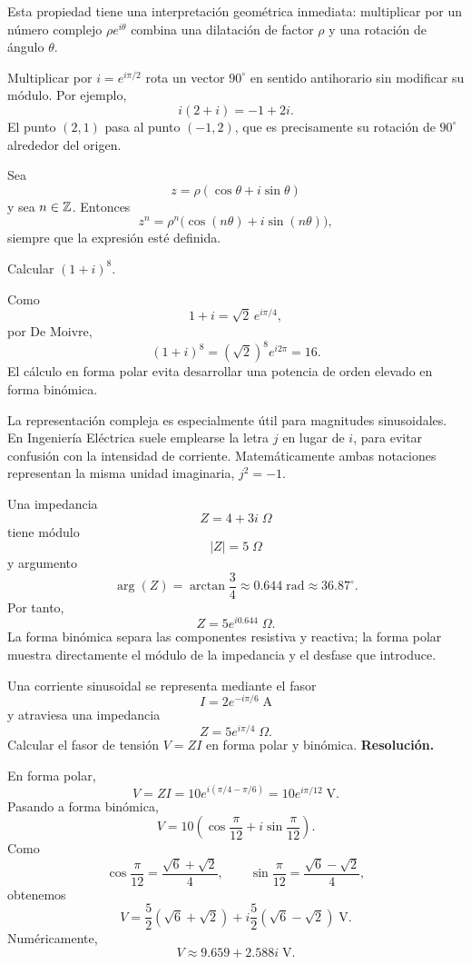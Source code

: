 Esta propiedad tiene una interpretación geométrica inmediata: multiplicar por un número complejo \(\rho e^{i\theta}\) combina una dilatación de factor \(\rho\) y una rotación de ángulo \(\theta\).

\begin{example}
Multiplicar por \(i=e^{i\pi/2}\) rota un vector \(90^\circ\) en sentido antihorario sin modificar su módulo. Por ejemplo,
\[
i(2+i)=-1+2i.
\]
El punto \((2,1)\) pasa al punto \((-1,2)\), que es precisamente su rotación de \(90^\circ\) alrededor del origen.
\end{example}

\begin{proposition}
Sea
\[
z=\rho(\cos\theta+i\sin\theta)
\]
y sea \(n\in\mathbb{Z}\). Entonces
\[
z^n=\rho^n\bigl(\cos(n\theta)+i\sin(n\theta)\bigr),
\]
siempre que la expresión esté definida.
\end{proposition}

\begin{example}
Calcular \((1+i)^8\).

Como
\[
1+i=\sqrt2\,e^{i\pi/4},
\]
por De Moivre,
\[
(1+i)^8=(\sqrt2)^8e^{i2\pi}=16.
\]
El cálculo en forma polar evita desarrollar una potencia de orden elevado en forma binómica.
\end{example}

La representación compleja es especialmente útil para magnitudes sinusoidales. En Ingeniería Eléctrica suele emplearse la letra \(j\) en lugar de \(i\), para evitar confusión con la intensidad de corriente. Matemáticamente ambas notaciones representan la misma unidad imaginaria, \(j^2=-1\).

\begin{example}
Una impedancia
\[
Z=4+3i\;\Omega
\]
tiene módulo
\[
|Z|=5\;\Omega
\]
y argumento
\[
\arg(Z)=\arctan\frac34\approx0.644\;\mathrm{rad}\approx36.87^\circ.
\]
Por tanto,
\[
Z=5e^{i0.644}\;\Omega.
\]
La forma binómica separa las componentes resistiva y reactiva; la forma polar muestra directamente el módulo de la impedancia y el desfase que introduce.
\end{example}

\begin{solvedexercise}
Una corriente sinusoidal se representa mediante el fasor
\[
I=2e^{-i\pi/6}\;\mathrm{A}
\]
y atraviesa una impedancia
\[
Z=5e^{i\pi/4}\;\Omega.
\]
Calcular el fasor de tensión \(V=ZI\) en forma polar y binómica.
\tcblower
\textbf{Resolución.}\par\smallskip
En forma polar,
\[
V=ZI=10e^{i(\pi/4-\pi/6)}=10e^{i\pi/12}\;\mathrm{V}.
\]
Pasando a forma binómica,
\[
V=10\left(\cos\frac{\pi}{12}+i\sin\frac{\pi}{12}\right).
\]
Como
\[
\cos\frac{\pi}{12}=\frac{\sqrt6+\sqrt2}{4},
\qquad
\sin\frac{\pi}{12}=\frac{\sqrt6-\sqrt2}{4},
\]
obtenemos
\[
V=\frac52(\sqrt6+\sqrt2)
+i\frac52(\sqrt6-\sqrt2)\;\mathrm{V}.
\]
Numéricamente,
\[
V\approx9.659+2.588i\;\mathrm{V}.
\]
\end{solvedexercise}

